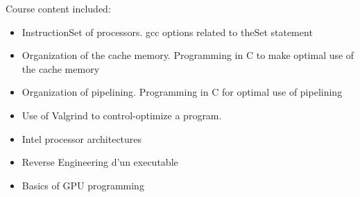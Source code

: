Course content included:
\begin{itemize}
    \item InstructionSet of processors. gcc options related to theSet statement
    \item Organization of the cache memory. Programming in C to make optimal use of the cache memory
    \item Organization of pipelining. Programming in C for optimal use of pipelining
    \item Use of Valgrind to control-optimize a program.
    \item Intel processor architectures
    \item Reverse Engineering d'un executable
    \item Basics of GPU programming
\end{itemize}